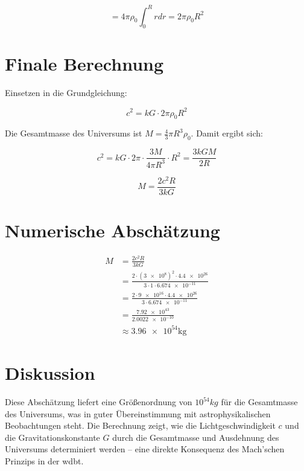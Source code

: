 \begin{equation}
    = 4\pi \rho_0 \int_0^R r  dr = 2\pi \rho_0 R^2
\end{equation}

\section{Finale Berechnung}
Einsetzen in die Grundgleichung:

\begin{equation}
    c^2 = k G \cdot 2\pi \rho_0 R^2
\end{equation}

Die Gesamtmasse des Universums ist $M = \frac{4}{3} \pi R^3 \rho_0$. Damit ergibt sich:

\begin{equation}
    c^2 = k G \cdot 2\pi \cdot \frac{3M}{4\pi R^3} \cdot R^2 = \frac{3k G M}{2 R}
\end{equation}

\begin{equation}
    M = \frac{2 c^2 R}{3k G}
\end{equation}

\section{Numerische Abschätzung}

\begin{align}
M &= \frac{2 c^2 R}{3k G} \\
  &= \frac{2 \cdot (\num{3e8})^2 \cdot \num{4.4e26}}{3 \cdot 1 \cdot \num{6.674e-11}} \\
  &= \frac{2 \cdot \num{9e16} \cdot \num{4.4e26}}{3 \cdot \num{6.674e-11}} \\
  &= \frac{\num{7.92e43}}{\num{2.0022e-10}} \\
  &\approx \num{3.96e54}  \si{\kilo\gram}
\end{align}

\section{Diskussion}
Diese Abschätzung liefert eine Größenordnung von $10^{54} kg$ für die Gesamtmasse des Universums, was in guter Übereinstimmung mit astrophysikalischen Beobachtungen steht. Die Berechnung zeigt, wie die
Lichtgeschwindigkeit $c$ und die Gravitationskonstante $G$ durch die Gesamtmasse und Ausdehnung des Universums determiniert werden – eine direkte Konsequenz des Mach'schen Prinzips in der \gls{wdbt}.

